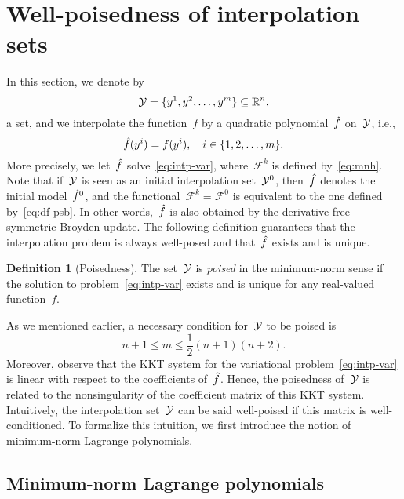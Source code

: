 \documentclass{article}
\numberwithin{equation}{section}
\theoremstyle{definition}
\newtheorem{definition}{Definition}[section]
\theoremstyle{plain}
\theoremstyle{remark}
\newcommand*{\obj}{f}
\newcommand*{\objm}[1][]{\hat{\obj}\ifblank{#1}{}{^{#1}}}
\newcommand*{\R}{\mathbb{R}}
\newcommand*{\set}[2][]{#1\{#2#1\}}
\newcommand*{\xpt}[1][]{\mathcal{Y}\ifblank{#1}{}{^{#1}}}
\begin{document}
\section{Well-poisedness of interpolation sets}
\label{sec:well-poisedness}

In this section, we denote by
\begin{equation*}
    \xpt = \set{y^1, y^2, \dots, y^m} \subseteq \R^n,
\end{equation*}
a set, and we interpolate the function~$\obj$ by a quadratic polynomial~$\objm$ on~$\xpt$, i.e.,
\begin{equation}
    \label{eq:intp-cond-gen}
    \objm(y^i) = \obj(y^i), \quad i \in \set{1, 2, \dots, m}.
\end{equation}
More precisely, we let~$\objm$ solve~\eqref{eq:intp-var}, where~$\mathcal{F}^k$ is defined by~\eqref{eq:mnh}.
Note that if~$\xpt$ is seen as an initial interpolation set~$\xpt[0]$, then~$\objm$ denotes the initial model~$\objm[0]$, and the functional~$\mathcal{F}^k = \mathcal{F}^0$ is equivalent to the one defined by~\eqref{eq:df-psb}.
In other words,~$\objm$ is also obtained by the derivative-free symmetric Broyden update.
The following definition guarantees that the interpolation problem is always well-posed and that~$\objm$ exists and is unique.

\begin{definition}[Poisedness]
    The set~$\xpt$ is \emph{poised} in the minimum-norm sense if the solution to problem~\eqref{eq:intp-var} exists and is unique for any real-valued function~$\obj$.
\end{definition}

As we mentioned earlier, a necessary condition for~$\xpt$ to be poised is
\begin{equation*}
    n + 1 \le m \le \frac{1}{2} (n + 1) (n + 2).
\end{equation*}
Moreover, observe that the KKT system for the variational problem~\eqref{eq:intp-var} is linear with respect to the coefficients of~$\objm$.
Hence, the poisedness of~$\xpt$ is related to the nonsingularity of the coefficient matrix of this KKT system.
Intuitively, the interpolation set~$\xpt$ can be said well-poised if this matrix is well-conditioned.
To formalize this intuition, we first introduce the notion of minimum-norm Lagrange polynomials.

\subsection{Minimum-norm Lagrange polynomials}
\end{document}
